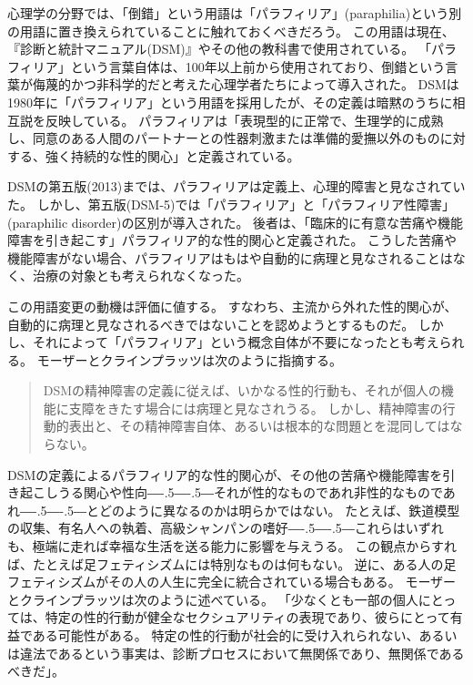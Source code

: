 \documentclass[paper=a4,book,openany]{jlreq}
\newcommand{\ig}[1]{}           %
\def\DDASH{―\kern-.5\zw―\kern-.5\zw―} %
\begin{document}
心理学の分野では、「倒錯」という用語は「パラフィリア」(paraphilia)という別の用語に置き換えられていることに触れておくべきだろう。
この用語は現在、『診断と統計マニュアル(DSM)』\ig{診断と統計マニュアル}やその他の教科書で使用されている。
「パラフィリア」という言葉自体は、100年以上前から使用されており、倒錯という言葉が侮蔑的かつ非科学的だと考えた心理学者たちによって導入された。
DSMは1980年に「パラフィリア」という用語を採用したが、その定義は暗黙のうちに相互説を反映している。
パラフィリアは「表現型的に正常で、生理学的に成熟し、同意のある人間のパートナーとの性器刺激または準備的愛撫以外のものに対する、強く持続的な性的関心」と定義されている\citep[p.685]{APA13:DSM}。

DSMの第五版(2013)までは、パラフィリアは定義上、心理的障害と見なされていた。
しかし、第五版(DSM-5)では「パラフィリア」と「パラフィリア性障害」(paraphilic disorder)の区別が導入された。
後者は、「臨床的に有意な苦痛や機能障害を引き起こす」パラフィリア的な性的関心と定義された\citep[p.694]{APA13:DSM}\ig{診断と統計マニュアル}。
こうした苦痛や機能障害がない場合、パラフィリアはもはや自動的に病理と見なされることはなく、治療の対象とも考えられなくなった。

この用語変更の動機は評価に値する。
すなわち、主流から外れた性的関心が、自動的に病理と見なされるべきではないことを認めようとするものだ。
しかし、それによって「パラフィリア」という概念自体が不要になったとも考えられる。
モーザーとクラインプラッツは次のように指摘する。

\begin{quote}
  DSMの精神障害の定義に従えば、いかなる性的行動も、それが個人の機能に支障をきたす場合には病理と見なされうる。
しかし、精神障害の行動的表出と、その精神障害自体、あるいは根本的な問題とを混同してはならない。
\citep[p.103]{moser05:_dsm_iv_tr_parap}\ig{診断と統計マニュアル}

\end{quote}

DSM\ig{診断と統計マニュアル}の定義によるパラフィリア的な性的関心が、その他の苦痛や機能障害を引き起こしうる関心や性向{\DDASH}それが性的なものであれ非性的なものであれ{\DDASH}とどのように異なるのかは明らかではない。
たとえば、鉄道模型の収集、有名人への執着、高級シャンパンの嗜好{\DDASH}これらはいずれも、極端に走れば幸福な生活を送る能力に影響を与えうる。
この観点からすれば、たとえば足フェティシズムには特別なものは何もない。
逆に、ある人の足フェティシズムがその人の人生に完全に統合されている場合もある。
モーザーとクラインプラッツは次のように述べている。
「少なくとも一部の個人にとっては、特定の性的行動が健全なセクシュアリティの表現であり、彼らにとって有益である可能性がある。
特定の性的行動が社会的に受け入れられない、あるいは違法であるという事実は、診断プロセスにおいて無関係であり、無関係であるべきだ」\citep[p.95]{moser05:_dsm_iv_tr_parap}。
\end{document}
